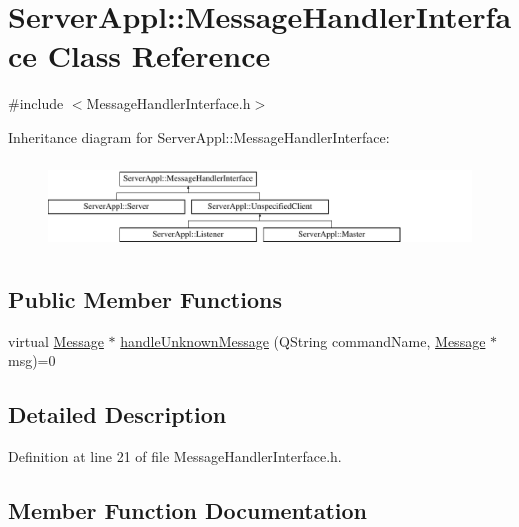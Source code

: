 \hypertarget{class_server_appl_1_1_message_handler_interface}{}\section{Server\+Appl\+:\+:Message\+Handler\+Interface Class Reference}
\label{class_server_appl_1_1_message_handler_interface}


{\ttfamily \#include $<$Message\+Handler\+Interface.\+h$>$}

Inheritance diagram for Server\+Appl\+:\+:Message\+Handler\+Interface\+:\begin{figure}[H]
\begin{center}
\leavevmode
\includegraphics[height=2.362869cm]{class_server_appl_1_1_message_handler_interface}
\end{center}
\end{figure}
\subsection*{Public Member Functions}
\begin{DoxyCompactItemize}
\item 
virtual \hyperlink{class_message}{Message} $\ast$ \hyperlink{class_server_appl_1_1_message_handler_interface_a12267f6f59f174d3608285cbc5be3415}{handle\+Unknown\+Message} (Q\+String command\+Name, \hyperlink{class_message}{Message} $\ast$msg)=0
\end{DoxyCompactItemize}


\subsection{Detailed Description}


Definition at line 21 of file Message\+Handler\+Interface.\+h.



\subsection{Member Function Documentation}
\hypertarget{class_server_appl_1_1_message_handler_interface_a12267f6f59f174d3608285cbc5be3415}{}
